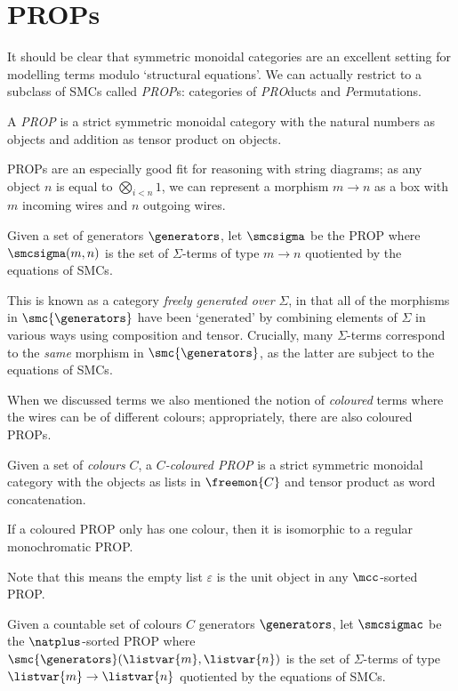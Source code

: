 \section{PROPs}

It should be clear that symmetric monoidal categories are an excellent setting
for modelling terms modulo `structural equations'.
We can actually restrict to a subclass of SMCs called \emph{PROP}s: categories
of \emph{PRO}ducts and \emph{P}ermutations.

\begin{definition}
    A \emph{PROP} is a strict symmetric monoidal category with the
    natural numbers as objects and addition as tensor product on objects.
\end{definition}

PROPs are an especially good fit for reasoning with string diagrams; as any
object \(n\) is equal to \(\bigotimes_{i < n} 1\), we can represent a morphism
\(m \to n\) as a box with \(m\) incoming wires and \(n\) outgoing wires.

\begin{definition}\label{def:freely-generated-prop}
    Given a set of generators \(\generators\), let \(\smcsigma\) be the
    PROP where \(\smcsigma(m, n)\) is the set of \(\Sigma\)-terms of type
    \(m \to n\) quotiented by the equations of SMCs.
\end{definition}

This is known as a category \emph{freely generated over} \(\Sigma\), in that all
of the morphisms in \(\smc{\generators}\) have been `generated' by combining
elements of \(\Sigma\) in various ways using composition and tensor.
Crucially, many \(\Sigma\)-terms correspond to the \emph{same} morphism in
\(\smc{\generators}\), as the latter are subject to the equations of SMCs.

When we discussed terms we also mentioned the notion of \emph{coloured} terms
where the wires can be of different colours; appropriately, there are also
coloured PROPs.

\begin{definition}
    Given a set of \emph{colours} \(C\), a \emph{\(C\)-coloured PROP} is a strict
    symmetric monoidal category with the objects as lists in \(\freemon{C}\) and
    tensor product as word concatenation.
\end{definition}

\begin{remark}
    If a coloured PROP only has one colour, then it is isomorphic to a regular
    monochromatic PROP.
\end{remark}

Note that this means the empty list \(\varepsilon\) is the unit
object in any \(\mcc\)-sorted PROP.

\begin{definition}\label{def:freely-generated-coloured-prop}
    Given a countable set of colours \(C\) generators \(\generators\), let
    \(\smcsigmac\) be the
    \(\natplus\)-sorted PROP where
    \(\smc{\generators}(\listvar{m}, \listvar{n})\) is the set of
    \(\Sigma\)-terms of type \(\listvar{m} \to \listvar{n}\) quotiented by
    the equations of SMCs.
\end{definition}
